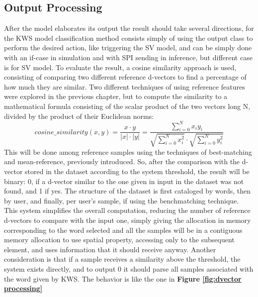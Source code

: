 \subsection{Output Processing}
After the model elaborates its output the result should take several directions, for the KWS model classification method consists simply of using the output class to perform the desired action, like triggering the SV model, and can be simply done with an if-case in simulation and with SPI sending in inference, but different case is for SV model. To evaluate the result, a cosine similarity approach is used, consisting of comparing two different reference d-vectors to find a percentage of how much they are similar. Two different techniques of using reference features were explored in the previous chapter, but to compute the similarity to a mathematical formula consisting of the scalar product of the two vectors long N, divided by the product of their Euclidean norms:\newline
\begin{equation}
    cosine\_similarity(x,y)=\frac{x\cdot y}{|x|\cdot|y|}=\frac{\sum_{i=0}^{N}x_iy_i}{\sqrt{\sum_{i=0}^{N}x_i^2}\cdot\sqrt{\sum_{i=0}^{N}y_i^2}}
\end{equation}
This will be done among reference samples using the techniques of best-matching and mean-reference, previously introduced. So, after the comparison with the d-vector stored in the dataset according to the system threshold, the result will be binary: 0, if a d-vector similar to the one given in input in the dataset was not found, and 1 if yes.\newline
The structure of the dataset is first cataloged by words, then by user, and finally, per user's sample, if using the benchmatching technique. This system simplifies the overall computation, reducing the number of reference d-vectors to compare with the input one, simply giving the allocation in memory corresponding to the word selected and all the samples will be in a contiguous memory allocation to use spatial property, accessing only to the subsequent element, and uses information that it should receive anyway. Another consideration is that if a sample receives a similarity above the threshold, the system exists directly, and to output 0 it should parse all samples associated with the word given by KWS. The behavior is like the one in \textbf{Figure \ref{fig:dvector processing}}\newline
